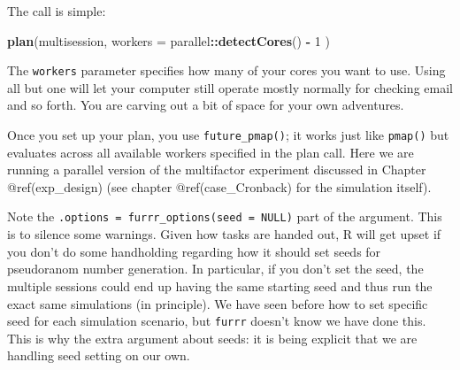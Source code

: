 \documentclass[
]{book}
\newenvironment{Shaded}{\begin{snugshade}}{\end{snugshade}}
\newcommand{\AttributeTok}[1]{\textcolor[rgb]{0.13,0.29,0.53}{#1}}
\newcommand{\ConstantTok}[1]{\textcolor[rgb]{0.56,0.35,0.01}{#1}}
\newcommand{\DecValTok}[1]{\textcolor[rgb]{0.00,0.00,0.81}{#1}}
\newcommand{\FunctionTok}[1]{\textcolor[rgb]{0.13,0.29,0.53}{\textbf{#1}}}
\newcommand{\NormalTok}[1]{#1}
\newcommand{\OtherTok}[1]{\textcolor[rgb]{0.56,0.35,0.01}{#1}}
\newcommand{\SpecialCharTok}[1]{\textcolor[rgb]{0.81,0.36,0.00}{\textbf{#1}}}
\begin{document}
The call is simple:

\begin{Shaded}
\begin{Highlighting}[]
\FunctionTok{plan}\NormalTok{(multisession, }\AttributeTok{workers =}\NormalTok{ parallel}\SpecialCharTok{::}\FunctionTok{detectCores}\NormalTok{() }\SpecialCharTok{{-}} \DecValTok{1}\NormalTok{ )}
\end{Highlighting}
\end{Shaded}

The \texttt{workers} parameter specifies how many of your cores you want to use.
Using all but one will let your computer still operate mostly normally for checking email and so forth.
You are carving out a bit of space for your own adventures.

Once you set up your plan, you use \texttt{future\_pmap()}; it works just like \texttt{pmap()} but evaluates across all available workers specified in the plan call.
Here we are running a parallel version of the multifactor experiment discussed in Chapter @ref(exp\_design) (see chapter @ref(case\_Cronback) for the simulation itself).

\begin{Shaded}
\end{Shaded}

Note the \texttt{.options\ =\ furrr\_options(seed\ =\ NULL)} part of the argument.
This is to silence some warnings.
Given how tasks are handed out, R will get upset if you don't do some handholding regarding how it should set seeds for pseudoranom number generation.
In particular, if you don't set the seed, the multiple sessions could end up having the same starting seed and thus run the exact same simulations (in principle).
We have seen before how to set specific seed for each simulation scenario, but \texttt{furrr} doesn't know we have done this.
This is why the extra argument about seeds: it is being explicit that we are handling seed setting on our own.
\end{document}
